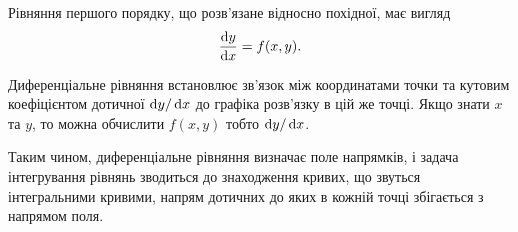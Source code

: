 Рівняння першого порядку, що розв'язане відносно похідної, має вигляд
\begin{equation*}
	\frac{\mathop{}\!\mathrm{d} y}{\mathop{}\!\mathrm{d} x} = f(x, y).	
\end{equation*}

Диференціальне рівняння встановлює зв'язок між координатами точки та кутовим коефіцієнтом дотичної $\mathop{}\!\mathrm{d} y / \mathop{}\!\mathrm{d} x$ до графіка розв'язку в цій же точці. Якщо знати $x$ та $y$, то можна обчислити $f(x, y)$ тобто $\mathop{}\!\mathrm{d} y / \mathop{}\!\mathrm{d} x$. \parvskip

Таким чином, диференціальне рівняння визначає поле напрямків, і задача інтегрування рівнянь зводиться до знаходження кривих, що звуться інтегральними кривими, напрям дотичних до яких в кожній точці збігається з напрямом поля.
